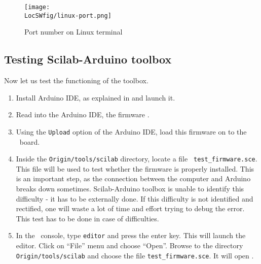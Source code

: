\begin{figure}
      \centering
      \texttt{[image: \\LocSWfig/linux-port.png]}
      \caption{Port number on Linux terminal}
      \label{linux-port}
\end{figure}

\subsection{Testing Scilab-Arduino toolbox}
\label{sec:testing-scilab-arduino}
Now let us test the functioning of the toolbox. 
\begin{enumerate}
      \item Install Arduino IDE, as explained in  and
            launch it.
      \item Read into the Arduino IDE, the firmware .
      \item Using the {\tt Upload} option of the Arduino IDE, load this
            firmware on to the \arduino\ board.
      \item Inside the {\tt Origin/tools/scilab} directory, locate a file {\tt
                        test\_firmware.sce}. This file will be used to test whether the
            firmware is properly installed.  This is an important step, as the
            connection between the computer and Arduino breaks down sometimes.
            Scilab-Arduino toolbox is unable to identify this difficulty - it has to
            be externally done.  If this difficulty is not identified and
            rectified, one will waste a lot of time and effort trying to debug
            the error.  This test has to be done in case of difficulties.
      \item In the \scilab\ console, type {\tt editor} and press the enter
            key. This will launch the editor. Click on ``File'' menu and choose
            ``Open''. Browse to the directory {\tt Origin/tools/scilab} and choose the
            file {\tt test\_firmware.sce}.  It will open
            .  
            

\end{enumerate}
